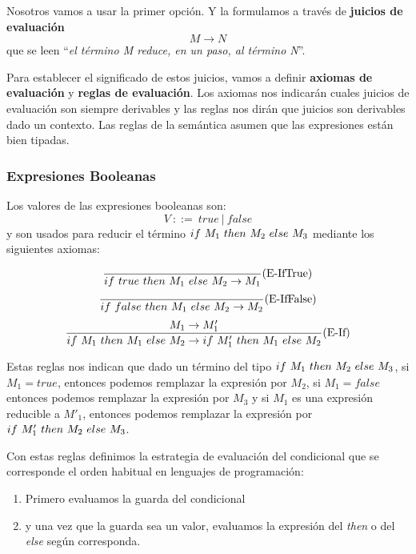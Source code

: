 Nosotros vamos a usar la primer opción. Y la formulamos a través de \textbf{juicios de evaluación} 
$$M\to N$$ que se leen ``\textit{el término M reduce, en un paso, al término N}''.

Para establecer el significado de estos juicios, vamos a definir \textbf{axiomas de evaluación} y \textbf{reglas de evaluación}. Los axiomas nos indicarán cuales juicios de evaluación son siempre derivables y las reglas nos dirán que juicios son derivables dado un contexto. Las reglas de la semántica asumen que las expresiones están bien tipadas.

\subsubsection{Expresiones Booleanas}\label{calculo_lambda:semantica:booleanas}
Los valores de las  expresiones booleanas son:
$$ V~::=~true~|~false$$
y son usados para reducir el término $if~ M_1~ then~ M_2~ else~ M_3$ mediante los siguientes axiomas:

\begin{equation*}
\frac{}{if~ true~ then~ M_1~ else~ M_2 \to M_1}(\text{E-IfTrue})
\end{equation*}
\vspace*{5mm}
\begin{equation*}
\frac{}{if~ false~ then~ M_1~ else~ M_2 \to M_2}(\text{E-IfFalse})
\end{equation*}
\vspace*{5mm}
\begin{equation*}
\frac{M_1\to M'_1}{if~ M_1~ then~ M_1~ else~ M_2\to if~ M'_1~ then~ M_1~ else~ M_2}(\text{E-If})
\end{equation*}

\vspace*{5mm}
Estas reglas nos indican que dado un término del tipo $if~ M_1~ then~ M_2~ else~ M_3$, si $M_1 = true$, entonces podemos remplazar la expresión por $M_2$, si $M_1=false$ entonces podemos remplazar la expresión por $M_3$ y si $M_1$ es una expresión reducible a $M'_1$, entonces podemos remplazar la expresión por $if~ M'_1~ then~ M_2~ else~ M_3$.

Con estas reglas definimos la estrategia de evaluación del condicional que se corresponde el orden habitual en lenguajes de programación:
\begin{enumerate}
    \item Primero evaluamos la guarda del condicional
    \item y una vez que la guarda sea un valor, evaluamos la expresión del \textit{then} o del \textit{else} según corresponda.
\end{enumerate}

